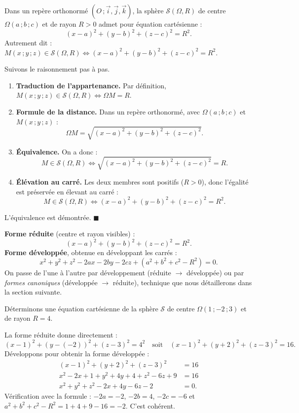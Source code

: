 \documentclass[11pt]{article}
\begin{document}
\begin{propriete}
Dans un repère orthonormé $(O\,;\vec{i},\vec{j},\vec{k})$, la sphère $\mathcal{S}(\Omega, R)$ de centre $\Omega(a\,;b\,;c)$ et de rayon $R > 0$ admet pour équation cartésienne :
\[ (x-a)^2 + (y-b)^2 + (z-c)^2 = R^2. \]
Autrement dit : $M(x\,;y\,;z) \in \mathcal{S}(\Omega, R) \iff (x-a)^2+(y-b)^2+(z-c)^2 = R^2$.
\end{propriete}

\begin{experience}
Suivons le raisonnement pas à pas.
\begin{enumerate}
  \item \textbf{Traduction de l'appartenance.} Par définition, $M(x\,;y\,;z) \in \mathcal{S}(\Omega, R) \iff \Omega M = R$.
  \item \textbf{Formule de la distance.} Dans un repère orthonormé, avec $\Omega(a\,;b\,;c)$ et $M(x\,;y\,;z)$ :
  \[ \Omega M = \sqrt{(x-a)^2 + (y-b)^2 + (z-c)^2}. \]
  \item \textbf{Équivalence.} On a donc :
  \[ M \in \mathcal{S}(\Omega, R) \iff \sqrt{(x-a)^2+(y-b)^2+(z-c)^2} = R. \]
  \item \textbf{Élévation au carré.} Les deux membres sont positifs ($R>0$), donc l'égalité est préservée en élevant au carré :
  \[ M \in \mathcal{S}(\Omega, R) \iff (x-a)^2+(y-b)^2+(z-c)^2 = R^2. \]
\end{enumerate}
L'équivalence est démontrée. $\blacksquare$
\end{experience}

\begin{aretenir}
\textbf{Forme réduite} (centre et rayon visibles) :
\[ (x-a)^2 + (y-b)^2 + (z-c)^2 = R^2. \]
\textbf{Forme développée}, obtenue en développant les carrés :
\[ x^2+y^2+z^2 - 2ax - 2by - 2cz + \left(a^2+b^2+c^2-R^2\right) = 0. \]
On passe de l'une à l'autre par développement (réduite $\to$ développée) ou par \emph{formes canoniques} (développée $\to$ réduite), technique que nous détaillerons dans la section suivante.
\end{aretenir}

\begin{exemplebox}
Déterminons une équation cartésienne de la sphère $\mathcal{S}$ de centre $\Omega(1\,;-2\,;3)$ et de rayon $R = 4$.

La forme réduite donne directement :
\[ (x-1)^2 + (y-(-2))^2 + (z-3)^2 = 4^2 \quad\text{soit}\quad (x-1)^2+(y+2)^2+(z-3)^2 = 16. \]
Développons pour obtenir la forme développée :
\begin{align*}
(x-1)^2+(y+2)^2+(z-3)^2 &= 16\\
x^2-2x+1 + y^2+4y+4 + z^2-6z+9 &= 16\\
x^2+y^2+z^2 -2x+4y-6z -2 &= 0.
\end{align*}
Vérification avec la formule : $-2a=-2$, $-2b=4$, $-2c=-6$ et $a^2+b^2+c^2-R^2 = 1+4+9-16 = -2$. C'est cohérent.
\end{exemplebox}
\end{document}
